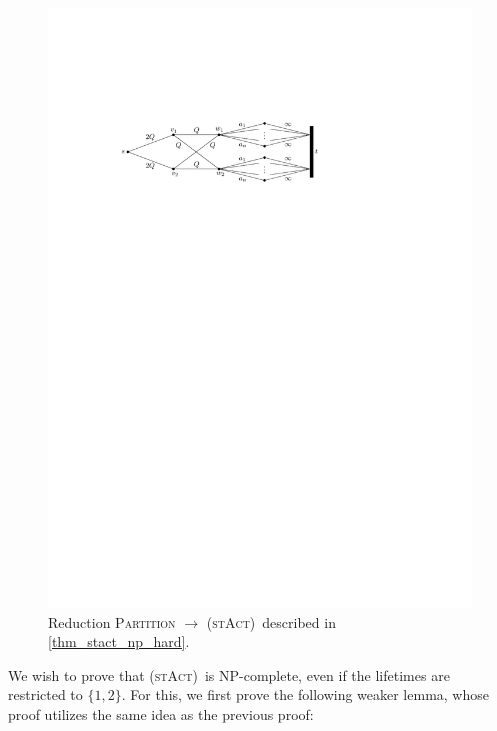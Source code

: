 \documentclass[10pt,a4paper]{article}
\numberwithin{equation}{section}
\newcommand{\set}[1]{\{ #1 \}}
\newcommand{\stact}{\textsc{(stAct)}}
\begin{document}
\begin{figure}[htpb]
\centering
\includegraphics[scale=1]{img/st-act-np-hard}
\caption{Reduction \textsc{Partition} $\rightarrow$ \stact\ described in \cref{thm_stact_np_hard}.}
\label{fig_stact_np_hard}
\end{figure}

We wish to prove that \stact\ is NP-complete, even if the lifetimes are restricted to $\set{1, 2}$. For this, we first prove the following weaker lemma, whose proof utilizes the same idea as the previous proof:
\end{document}
